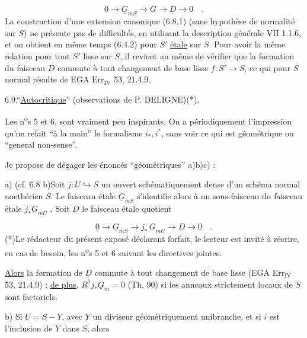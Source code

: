 \begin{equation}\tag{6.8.1}
0 \longrightarrow \underline{G}_{mS} \longrightarrow \overline{G} \longrightarrow \underline{D} \longrightarrow 0 \quad .
\end{equation}
La construction d'une extension canonique (6.8.1) (sans hypothèse de normalité sur $S$) ne présente pas de difficultés, en utilisant la description générale VII 1.1.6, et on obtient en même temps (6.4.2) pour $S'$ \underline{étale} sur $S$. Pour avoir la même relation pour tout $S'$ lisse sur $S$, il revient au même de vérifier que la formation du faisceau $\underline{D}$ commute à tout changement de base lisse $f: S' \longrightarrow S$, ce qui pour $S$ normal résulte de EGA $\mathrm{Err}_{\mathrm{IV}}$ 53, 21.4.9.


6.9.\quad ``\underline{Autocritique}'' (observations de P. DELIGNE)(*).

Les n\textsuperscript{o}s 5 et 6, sont vraiment peu inspirants. On a périodiquement l'impression qu'on refait ``à la main'' le formalisme $i_*,i^*$, sans voir ce qui est géométrique ou ``general non-sense''.

Je propose de dégager les énoncés ``géométriques'' a)b)c) :

a) (cf. 6.8 b)\quad Soit $j:U \hookrightarrow S$ un ouvert schématiquement dense d'un schéma normal noethérien $S$. Le faisceau étale $\underline{G}_{mS}$ s'identifie alors à un sous-faisceau du faisceau étale $j_{*}\underline{G}_{mU}$ . Soit $\underline{D}$ le faisceau étale quotient

\begin{equation*}
0 \longrightarrow \underline{G}_{mS} \longrightarrow j_{*} \, \underline{G}_{mU} \longrightarrow \underline{D} \longrightarrow 0 \quad .
\end{equation*}
(*)\quad Le rédacteur du présent exposé déclarant forfait, le lecteur est invité à récrire, en cas de besoin, les n\textsuperscript{o}s 5 et 6 suivant les directives jointes.



\underline{Alors} la formation de $\underline{D}$ commute à tout changement de base lisse (EGA Err$_{\mathrm{IV}}$ 53, 21.4.9) ; \underline{de plus}, $R^1 j_* \underline{G}_m = 0$ (Th. 90) si les anneaux strictement locaux de $S$ sont factoriels.

b) Si $U = S-Y$, avec $Y$ un diviseur géométriquement unibranche, et si $i$ est l'inclusion de $Y$ dans $S$, alors

